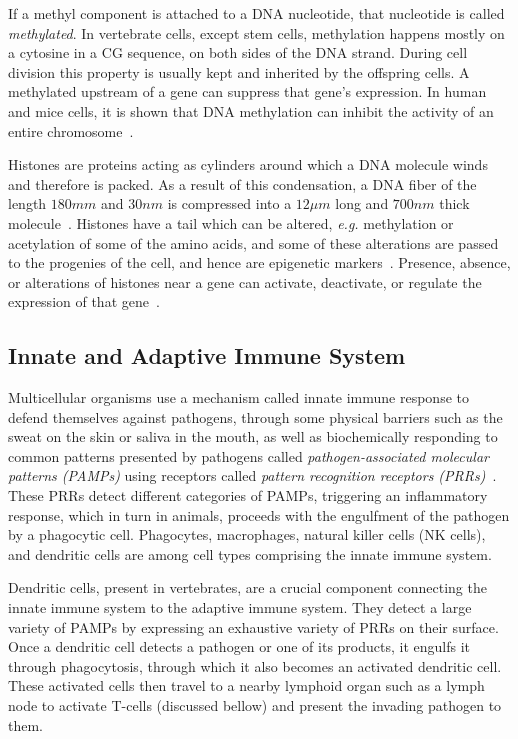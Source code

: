 If a methyl component is attached to a DNA nucleotide, that nucleotide is called \emph{methylated}. In vertebrate cells, except stem cells, methylation happens mostly on a cytosine in a CG sequence, on both sides of the DNA strand. During cell division this property is usually kept and inherited by the offspring cells. A methylated upstream of a gene can suppress that gene's expression. In human and mice cells, it is shown that DNA methylation can inhibit the activity of an entire chromosome~\cite[Ch. 7]{the-cell}.

Histones are proteins acting as cylinders around which a DNA molecule winds and therefore is packed. As a result of this condensation, a DNA fiber of the length $180mm$ and $30nm$ is compressed into a $12\mu m$ long and $700nm$ thick molecule~\cite{redon2002histone}. Histones have a tail which can be altered, \emph{e.g.} methylation or acetylation of some of the amino acids, and some of these alterations are passed to the progenies of the cell, and hence are epigenetic markers~\cite{turner2000histone, berger2009operational, moazed2011mechanisms}. Presence, absence, or alterations of histones near a gene can activate, deactivate, or regulate the expression of that gene~\cite{turner2000histone}.


\subsection{Innate and Adaptive Immune System}
\label{sec:bkg:immune-system}
Multicellular organisms use a mechanism called innate immune response to defend themselves against pathogens, through some physical barriers such as the sweat on the skin or saliva in the mouth, as well as biochemically responding to common patterns presented by pathogens called \emph{pathogen-associated molecular patterns (PAMPs)} using receptors called \emph{pattern recognition receptors (PRRs)}~\cite[Ch. 24]{the-cell}. These PRRs detect different categories of PAMPs, triggering an inflammatory response, which in turn in animals, proceeds with the engulfment of the pathogen by a phagocytic cell. Phagocytes, macrophages, natural killer cells (NK cells), and dendritic cells are among cell types comprising the innate immune system.

Dendritic cells, present in vertebrates, are a crucial component connecting the innate immune system to the adaptive immune system. They detect a large variety of PAMPs by expressing an exhaustive variety of PRRs on their surface. Once a dendritic cell detects a pathogen or one of its products, it engulfs it through phagocytosis, through which it also becomes an activated dendritic cell. These activated cells then travel to a nearby lymphoid organ such as a lymph node to activate T-cells (discussed bellow) and present the invading pathogen to them.

